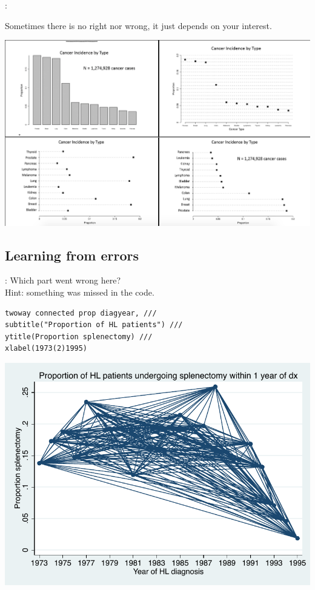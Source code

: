 \begin{frame}[allowframebreaks]{\secname: \subsecname}
\begin{center}
	\end{center}
	\framebreak
	Sometimes there is no right nor wrong, it just depends on your interest.
		\begin{center}
				\includegraphics[scale=0.3]{images/Cancer_incidence}
		\end{center}

\end{frame}

\subsection{Learning from errors}
\begin{frame}[fragile]{\secname: \subsecname}
Which part went wrong here? \\
Hint: something was missed in the code.

\small
\begin{verbatim}
twoway connected prop diagyear, ///
subtitle("Proportion of HL patients") ///
ytitle(Proportion splenectomy) ///
xlabel(1973(2)1995) 	
\end{verbatim}
\begin{center}
	\includegraphics[scale=0.4]{images/nosort}
\end{center}
\end{frame}

